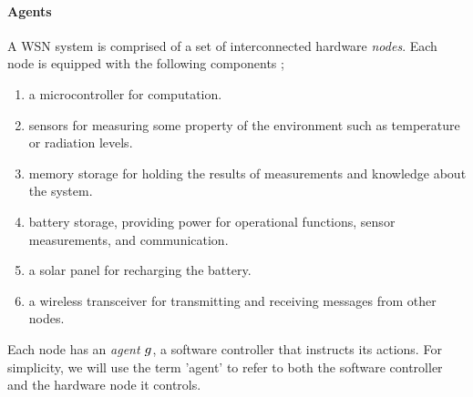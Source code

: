 \paragraph{Agents}
A WSN system is comprised of a set of interconnected hardware \textit{nodes}. Each node is equipped with the following components \citep{muhammad_r_ahmed_2012_1072589};
\begin{enumerate}
	\item a microcontroller for computation.
	\item sensors for measuring some property of the environment such as temperature or radiation levels.
	\item memory storage for holding the results of measurements and knowledge about the system.
	\item battery storage, providing power for operational functions, sensor measurements, and communication.
	\item a solar panel for recharging the battery.
	\item  a wireless transceiver for  transmitting and receiving messages from other nodes.
\end{enumerate}

Each node has an \textit{agent} $g_{}^{}$, a software controller that instructs its actions. For simplicity, we will use the term 'agent' to refer to both the software controller and the hardware node it controls.
